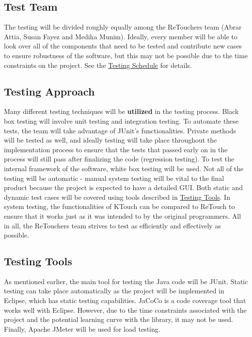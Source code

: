 \documentclass[12pt, titlepage]{article}
\begin{document}
\subsection{Test Team}

	The testing will be divided roughly equally among the ReTouchers team (Abrar Attia, Susan Fayez and Mediha Munim). Ideally, every member will be able to look over all of the components that need to be tested and contribute new cases to ensure robustness of the software, but this may not be possible due to the time constraints on the project. See the \hyperref[sec:ts]{Testing Schedule} for details.

\subsection{Testing Approach}

	Many different testing techniques will be \textbf{utilized} in the testing process. Black box testing will involve unit testing and integration testing. To automate these tests, the team will take advantage of JUnit's functionalities. Private methods will be tested as well, and ideally testing will take place throughout the implementation process to ensure that the tests that passed early on in the process will still pass after finalizing the code (regression testing). To test the internal framework of the software, white box testing will be used. Not all of the testing will be automatic - manual system testing will be vital to the final product because the project is expected to have a detailed GUI. Both static and dynamic test cases will be covered using tools described in \hyperref[sec:tt]{Testing Tools}. In system testing, the functionalities of KTouch can be compared to ReTouch to ensure that it works just as it was intended to by the original programmers. All in all, the ReTouchers team strives to test as efficiently and effectively as possible.

\subsection{Testing Tools}
\label{sec:tt}

	As mentioned earlier, the main tool for testing the Java code will be JUnit. Static testing can take place automatically as the project will be implemented in Eclipse, which has static testing capabilities. JaCoCo is a code coverage tool that works well with Eclipse. However, due to the time constraints associated with the project and the potential learning curve with the library, it may not be used. Finally, Apache JMeter will be used for load testing.
\end{document}
